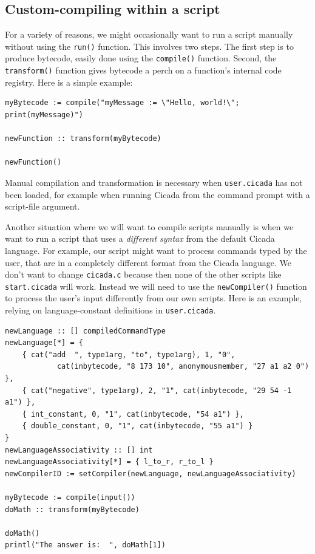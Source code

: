 \documentclass{article}
\newenvironment{code}{
       \begin{list}{}{
               \setlength{\leftmargin}{.4in}
               \setlength{\rightmargin}{0in}
               \setlength{\topsep}{.2in}
       }
       \small
       \item[] }
       { \end{list}   }
\begin{document}
 



\subsection{Custom-compiling within a script}%

For a variety of reasons, we might occasionally want to run a script manually without using the \verb#run()# function.  This involves two steps.  The first step is to produce bytecode, easily done using the \verb#compile()# function.  Second, the \verb#transform()# function gives bytecode a perch on a function's internal code registry.  Here is a simple example:

\begin{code} \begin{verbatim}
myBytecode := compile("myMessage := \"Hello, world!\"; print(myMessage)")

newFunction :: transform(myBytecode)

newFunction()
\end{verbatim} \end{code}

\noindent Manual compilation and transformation is necessary when \verb#user.cicada# has not been loaded, for example when running Cicada from the command prompt with a script-file argument.

Another situation where we will want to compile scripts manually is when we want to run a script that uses a \emph{different syntax} from the default Cicada language.  For example, our script might want to process commands typed by the user, that are in a completely different format from the Cicada language.  We don't want to change \verb#cicada.c# because then none of the other scripts like \verb#start.cicada# will work.  Instead we will need to use the \verb#newCompiler()# function to process the user's input differently from our own scripts.  Here is an example, relying on language-constant definitions in \verb#user.cicada#.

\begin{code} \begin{verbatim}
newLanguage :: [] compiledCommandType
newLanguage[*] = {
    { cat("add  ", type1arg, "to", type1arg), 1, "0",
            cat(inbytecode, "8 173 10", anonymousmember, "27 a1 a2 0") },
    { cat("negative", type1arg), 2, "1", cat(inbytecode, "29 54 -1 a1") },
    { int_constant, 0, "1", cat(inbytecode, "54 a1") },
    { double_constant, 0, "1", cat(inbytecode, "55 a1") }
}
newLanguageAssociativity :: [] int
newLanguageAssociativity[*] = { l_to_r, r_to_l }
newCompilerID := setCompiler(newLanguage, newLanguageAssociativity)

myBytecode := compile(input())
doMath :: transform(myBytecode)

doMath()
printl("The answer is:  ", doMath[1])
\end{verbatim} \end{code}
\end{document}
